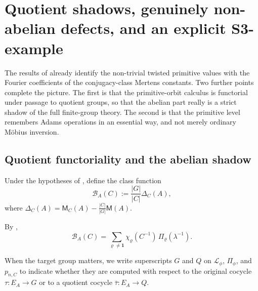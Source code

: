 \section[Quotient shadows and an explicit S3-example]{Quotient shadows,
  genuinely non-abelian defects, and an explicit S3-example}
\label{sec:shadows}

The results of  already identify the non-trivial
twisted primitive values with the Fourier coefficients of the
conjugacy-class Mertens constants. Two further points complete the
picture. The first is that the primitive-orbit calculus is functorial
under passage to quotient groups, so that the abelian part really is a
strict shadow of the full finite-group theory. The second is that the
primitive level remembers Adams operations in an essential way, and not
merely ordinary M\"obius inversion.

\subsection{Quotient functoriality and the abelian shadow}

\begin{definition}
  \label{def:normalised-primitive-class-profile}
  Under the hypotheses of , define the
  class function
  \[
    \mathcal B_A(C):=\frac{|G|}{|C|}\Delta_C(A),
  \]
  where \(\Delta_C(A)=\mathsf M_C(A)-\frac{|C|}{|G|}\mathsf M(A)\).
\end{definition}

By ,
\begin{equation}\label{eq:normalised-primitive-class-profile}
  \mathcal B_A(C)
  =
  \sum_{\varrho\neq \mathbf 1}
    \chi_\varrho(C^{-1})\,\Pi_\varrho(\lambda^{-1}).
\end{equation}

When the target group matters, we write superscripts \(G\) and \(Q\) on
\(\mathcal L_\phi\), \(\Pi_\phi\), and \(p_{n,C}\) to indicate whether
they are computed with respect to the original cocycle \(\tau:E_A\to G\)
or to a quotient cocycle \(\bar\tau:E_A\to Q\).

